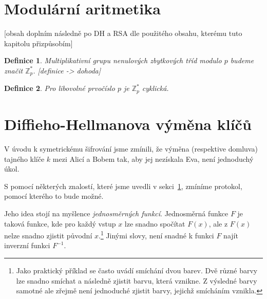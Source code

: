 \documentclass[12pt]{article}
\newtheorem{definition}{Definice}[section]
\begin{document}
\section{Modulární aritmetika}\label{sec:modular-arithmetic}

    [obsah doplním následně po DH a RSA dle použitého obsahu, kterému tuto kapitolu přizpůsobím]




    \begin{definition}\label{def:Z*p}
        Multiplikativní grupu nenulových zbytkových tříd modulo $p$ budeme značit $\mathbb{Z}^*_p$. [definice -> dohoda]
    \end{definition}

    \begin{definition}
        Pro libovolné prvočíslo $p$ je $\mathbb{Z}^*_p$ cyklická.
    \end{definition}




\section{Diffieho-Hellmanova výměna klíčů}\label{sec:diffie-hellman}



    V úvodu k symetrickému šifrování jsme zmínili, že výměna (respektive domluva)
    tajného klíče $k$ mezi Alicí a Bobem tak, aby jej nezískala Eva, není jednoduchý úkol.

    S pomocí některých znalostí, které jsme uvedli v sekci~\ref{sec:modular-arithmetic}, zmíníme protokol, pomocí kterého
    to bude možné.

    Jeho idea stojí na myšlence \emph{jednosměrných funkcí}. Jednosměrná funkce $F$ je taková funkce, kde pro každý vstup $x$ lze
    snadno spočítat $F(x)$, ale z $F(x)$ nelze snadno zjistit původní $x$.\footnote{Jako praktický příklad se často uvádí smíchání dvou barev.
    Dvě různé barvy lze snadno smíchat a následně zjistit barvu, která vznikne.
    Z výsledné barvy samotné ale zřejmě není jednoduché zjistit barvy, jejichž smícháním vznikla.}
    Jinými slovy, není snadné k funkci $F$ najít inverzní funkci $F^{-1}$.
\end{document}
